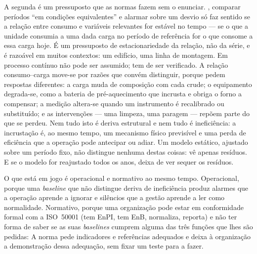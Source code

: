 A segunda é um pressuposto que as normas fazem sem o enunciar.
, comparar
períodos \enquote{em condições equivalentes} e alarmar sobre um desvio só faz sentido se a relação
entre consumo e variáveis relevantes for estável no tempo --- se o que
a unidade consumia a uma dada carga no período de referência for o que
consome a essa carga hoje. É um pressuposto de estacionariedade da
relação, não da série, e é razoável em muitos contextos: um edifício,
uma linha de montagem. Em processo contínuo não pode ser assumido; tem
de ser verificado. A relação consumo--carga move-se por razões que
convém distinguir, porque pedem respostas diferentes: a carga muda de
composição com cada crude; o equipamento degrada-se, como a bateria de
pré-aquecimento que incrusta e obriga o forno a compensar; a medição
altera-se quando um instrumento é recalibrado ou substituído; e as
intervenções --- uma limpeza, uma paragem --- repõem parte do que se
perdeu. Nem tudo isto é deriva estrutural e nem tudo é ineficiência: a
incrustação é, ao mesmo tempo, um mecanismo físico previsível e uma
perda de eficiência que a operação pode antecipar ou adiar. Um modelo
estático, ajustado sobre um período fixo, não distingue nenhuma destas
coisas: vê apenas resíduos. E se o modelo for reajustado todos os anos,
deixa de ver sequer os resíduos.


O que está em jogo é operacional e normativo ao mesmo tempo.
Operacional, porque uma \emph{baseline} que não distingue deriva de
ineficiência produz alarmes que a operação aprende a ignorar e
silêncios que a gestão aprende a ler como normalidade. Normativo, porque
uma organização pode estar em conformidade formal com a ISO~50001 (tem
EnPI, tem EnB, normaliza, reporta) e não ter forma de saber se as
suas \emph{baselines} cumprem alguma das três funções que lhes são
pedidas:  A norma pede indicadores e referências
adequados e deixa à organização a demonstração dessa adequação, sem fixar
um teste para a fazer.

